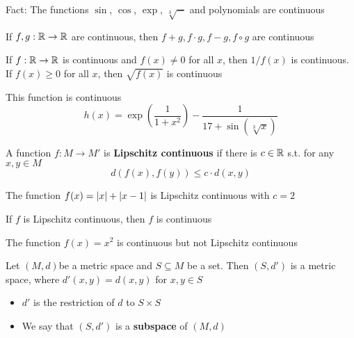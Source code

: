 \documentclass[11pt]{article}
\begin{document}
Fact: The functions \(\sin\), \(\cos\), \(\exp\), \(\sqrt[3]{-}\) and polynomials are continuous

\begin{proposition}[]
If \(f,g:\mathbb{R}\to\mathbb{R}\) are continuous, then \(f+g,f\cdot g,f-g,f\circ g\) are continuous
\end{proposition}

\begin{proposition}[]
If \(f:\mathbb{R}\to\mathbb{R}\) is continuous and \(f(x)\neq 0\) for all \(x\), then \(1/f(x)\) is continuous.
If \(f(x)\ge 0\) for all \(x\), then \(\sqrt{f(x)}\) is continuous
\end{proposition}

\begin{examplle}[]
This function is continuous
\begin{equation*}
h(x)=\exp\left( \frac{1}{1+x^2} \right)-\frac{1}{17+\sin(\sqrt[3]{x})}
\end{equation*}
\end{examplle}

\begin{definition}[]
A function \(f:M\to M'\) is \textbf{Lipschitz continuous} if there is \(c\in\mathbb{R}\) s.t. for any \(x,y\in M\)
\begin{equation*}
d(f(x),f(y))\le c\cdot d(x,y)
\end{equation*}
\end{definition}

\begin{examplle}[In \(\R\)]
The function \(f(x)=\abs{x}+\abs{x-1}\) is Lipschitz continuous with \(c=2\)
\end{examplle}

\begin{proposition}[]
If \(f\) is Lipschitz continuous, then \(f\) is continuous
\end{proposition}

\begin{examplle}[]
The function \(f(x)=x^2\) is continuous but not Lipschitz continuous
\end{examplle}

\begin{definition}[]
Let \((M,d)\)be a metric space and \(S\subseteq M\) be a set. Then \((S,d')\) is a metric space,
where \(d'(x,y)=d(x,y)\) for \(x,y\in S\)
\begin{itemize}
\item \(d'\) is the restriction of \(d\) to \(S\times S\)
\item We say that \((S,d')\) is a \textbf{subspace} of \((M,d)\)
\end{itemize}
\end{definition}
\end{document}
